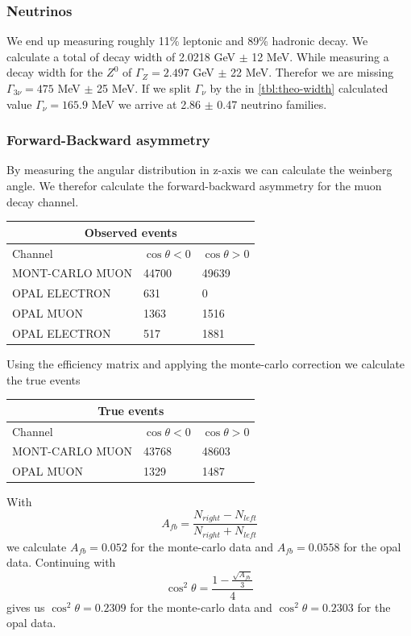 \documentclass[]{article}
\begin{document}
\subsubsection{Neutrinos}
We end up measuring roughly 11\% leptonic and 89\% hadronic decay.
We calculate a total of decay width of 2.0218 GeV $\pm$ 12 MeV. While measuring a decay width for the $Z^0$ of $\Gamma_Z=2.497$ GeV $\pm$ 22 MeV.
Therefor we are missing $\Gamma_{3\nu}=475$ MeV $\pm$ 25 MeV. If we split $\Gamma_{\nu}$ by the in \ref{tbl:theo-width} calculated value $\Gamma_{\nu}=165.9$ MeV we arrive at 2.86 $\pm$ 0.47 neutrino families.

\subsubsection{Forward-Backward asymmetry}
By measuring the angular distribution in z-axis we can calculate the weinberg angle. We therefor calculate the forward-backward asymmetry for the muon decay channel.
\newline
\newline
\begin{tabular}{ |p{5cm}||p{3cm}|p{3cm}|  }
 \hline
 \multicolumn{3}{|c|}{Observed events} \\
 \hline
 Channel & $\cos{\theta} < 0 $ & $\cos{\theta} > 0 $ \\
 \hline
 \hline
  MONT-CARLO MUON & 44700 & 49639 \\
  \hline
  OPAL ELECTRON & 631 & 0 \\
  OPAL MUON & 1363 & 1516 \\
  OPAL ELECTRON & 517 & 1881 \\
  \hline
\end{tabular}
\newline
\newline
Using the efficiency matrix and applying the monte-carlo correction we calculate the true events
\newline
\newline
\begin{tabular}{ |p{5cm}||p{3cm}|p{3cm}|  }
 \hline
 \multicolumn{3}{|c|}{True events} \\
 \hline
 Channel & $\cos{\theta} < 0 $ & $\cos{\theta} > 0 $ \\
 \hline
 \hline
  MONT-CARLO MUON & 43768 & 48603 \\
  \hline
  OPAL MUON & 1329 & 1487 \\
  \hline
\end{tabular}
\newline
\newline
With
\begin{equation}
A_{fb} = \frac{N_{right} - N_{left}}{N_{right} + N_{left}}
\end{equation}
we calculate $A_{fb}=0.052$ for the monte-carlo data and $A_{fb}=0.0558$ for the opal data. Continuing with
\begin{equation}
\cos^2{\theta} = \frac{1 - \frac{\sqrt{A_{fb}}}{3}}{4}
\end{equation}
gives us $\cos^2{\theta} = 0.2309$ for the monte-carlo data and $\cos^2{\theta} = 0.2303$ for the opal data.
\end{document}
